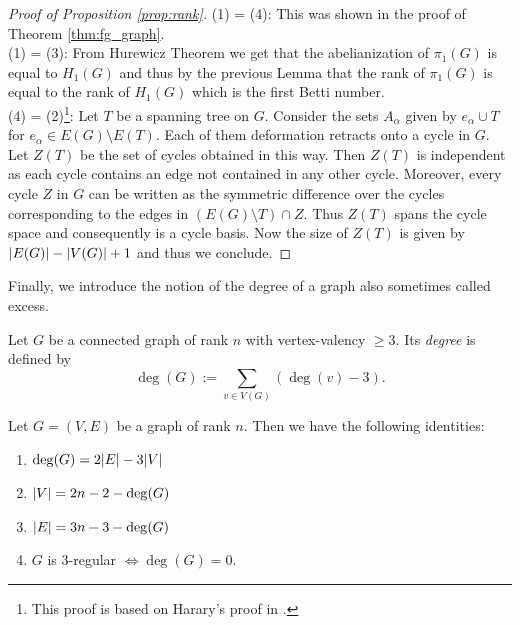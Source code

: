 \begin{proof}[Proof of Proposition \ref{prop:rank}]
	(1) = (4): This was shown in the proof of Theorem \ref{thm:fg_graph}.\\
	(1) = (3): From Hurewicz Theorem we get that the abelianization of $\pi_{1}(G)$ is equal to $H_{1}(G)$
	and thus by the previous Lemma that the rank of $\pi_1(G)$ is equal to the rank of $H_1(G)$ which is the first Betti number.\\
	(4) = (2)\footnote{This proof is based on Harary's proof in \cite[p. 37-40]{harary69}.}:
	Let $T$ be a spanning tree on $G$. Consider the sets $A_{\alpha}$ given by $e_{\alpha} \cup T$ for $e_{\alpha} \in E(G) \setminus E(T)$.
	Each of them deformation retracts onto a cycle in $G$. Let $Z(T)$ be the set of cycles obtained in this way. 
	Then  $Z(T)$ is independent as each cycle contains an edge not contained in any other cycle.
	Moreover, every cycle $Z$ in $G$ can be written as the symmetric difference over the cycles corresponding to the edges in $(E(G) \setminus T) \cap Z$.
	Thus $Z(T)$ spans the cycle space and consequently is a cycle basis. Now the size of $Z(T)$ is given by $\abs{E(G)} - \abs{V(G)} + 1$ and thus we conclude.
\end{proof}

Finally, we introduce the notion of the degree of a graph also sometimes called excess.
\begin{definition}
	Let $G$ be a connected graph of rank $n$ with vertex-valency $\geq 3$. Its \emph{degree} is defined by
	\[
		\deg(G) := \sum_{v \in V(G)} (\deg(v) - 3)
	.\] 
\end{definition}

\begin{proposition}
	Let $G = (V,E)$ be a graph of rank $n$. Then we have the following identities:
	\begin{enumerate}
		\item $\deg(G) = 2 \abs{E} - 3 \abs{V}$
		\item $\abs{V} = 2n -2 - \deg(G)$
		\item $\abs{E} = 3n - 3 - \deg(G)$
		\item $G$ is $3$-regular $\Leftrightarrow \deg(G) = 0$.
	\end{enumerate}	
\end{proposition}

